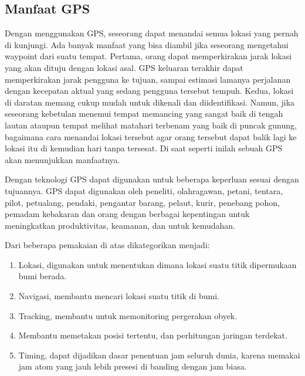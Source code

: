 \subsection{Manfaat GPS}
Dengan menggunakan GPS, seseorang dapat menandai semua lokasi yang pernah di kunjungi. Ada banyak manfaat yang bisa diambil jika seseorang mengetahui waypoint dari suatu tempat. Pertama, orang dapat memperkirakan jarak lokasi yang akan dituju dengan lokasi asal. GPS keluaran terakhir dapat memperkirakan jarak pengguna ke tujuan, sampai estimasi lamanya perjalanan dengan kecepatan aktual yang sedang pengguna tersebut tempuh. Kedua, lokasi di daratan memang cukup mudah untuk dikenali dan diidentifikasi. Namun, jika seseorang kebetulan menemui tempat memancing yang sangat baik di tengah lautan ataupun tempat melihat matahari terbenam yang baik di puncak gunung, bagaimana cara menandai lokasi tersebut agar orang tersebut dapat balik lagi ke lokasi itu di kemudian hari tanpa tersesat. Di saat seperti inilah sebuah GPS akan menunjukkan manfaatnya. 

Dengan teknologi GPS dapat digunakan untuk beberapa keperluan sesuai dengan tujuannya. GPS dapat digunakan oleh peneliti, olahragawan, petani, tentara, pilot, petualang, pendaki, pengantar barang, pelaut, kurir, penebang pohon, pemadam kebakaran dan orang dengan berbagai kepentingan untuk meningkatkan produktivitas, keamanan, dan untuk kemudahan.

Dari beberapa pemakaian di atas dikategorikan menjadi: 
\begin{enumerate}
	\item Lokasi, digunakan untuk menentukan dimana lokasi suatu titik dipermukaan bumi berada. 
	\item Navigasi, membantu mencari lokasi suatu titik di bumi. 
	\item Tracking, membantu untuk memonitoring pergerakan obyek.
	\item Membantu memetakan posisi tertentu, dan perhitungan jaringan terdekat. 
	\item Timing, dapat dijadikan dasar penentuan jam seluruh dunia, karena memakai jam atom yang jauh lebih presesi di banding dengan jam biasa.
\end{enumerate}


